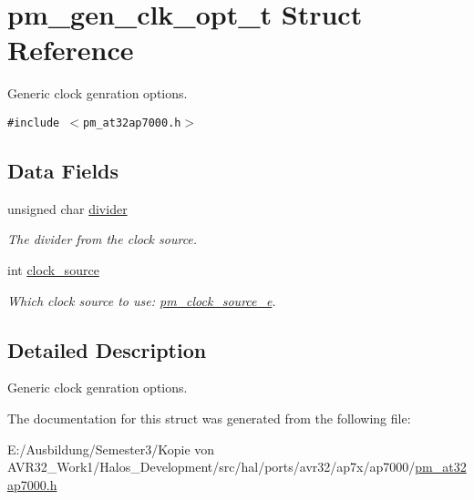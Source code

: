 \hypertarget{structpm__gen__clk__opt__t}{
\section{pm\_\-gen\_\-clk\_\-opt\_\-t Struct Reference}
\label{structpm__gen__clk__opt__t}
}
Generic clock genration options.  


{\tt \#include $<$pm\_\-at32ap7000.h$>$}

\subsection*{Data Fields}
\begin{CompactItemize}
\item 
\hypertarget{structpm__gen__clk__opt__t_e495c8ca4f93880050fd933007e01dd8}{
unsigned char \hyperlink{structpm__gen__clk__opt__t_e495c8ca4f93880050fd933007e01dd8}{divider}}
\label{structpm__gen__clk__opt__t_e495c8ca4f93880050fd933007e01dd8}

\begin{CompactList}\small\item\em The divider from the clock source. \item\end{CompactList}\item 
\hypertarget{structpm__gen__clk__opt__t_d3a47091ba56f4c0181a49f871ba1f1f}{
int \hyperlink{structpm__gen__clk__opt__t_d3a47091ba56f4c0181a49f871ba1f1f}{clock\_\-source}}
\label{structpm__gen__clk__opt__t_d3a47091ba56f4c0181a49f871ba1f1f}

\begin{CompactList}\small\item\em Which clock source to use: \hyperlink{pm__at32ap7000_8h_e3792d2f861d39eed0dd8a82ec76346e}{pm\_\-clock\_\-source\_\-e}. \item\end{CompactList}\end{CompactItemize}


\subsection{Detailed Description}
Generic clock genration options. 

The documentation for this struct was generated from the following file:\begin{CompactItemize}
\item 
E:/Ausbildung/Semester3/Kopie von AVR32\_\-Work1/Halos\_\-Development/src/hal/ports/avr32/ap7x/ap7000/\hyperlink{pm__at32ap7000_8h}{pm\_\-at32ap7000.h}\end{CompactItemize}
